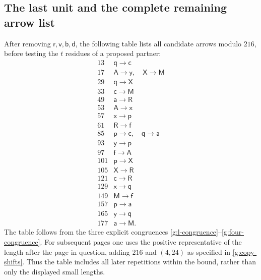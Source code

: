 \subsection{The last unit and the complete remaining arrow list}

After removing $\mathsf r,\mathsf v,\mathsf b,\mathsf d$,
the following table lists all candidate arrows modulo
$216$, before testing the $t$ residues of a proposed
partner:
\begin{equation}\label{g:remaining-mod216}
\begin{array}{c|l}
13&\mathsf q\longrightarrow\mathsf c\\
17&\mathsf A\longrightarrow\mathsf y,\quad
   \mathsf X\longrightarrow\mathsf M\\
29&\mathsf q\longrightarrow\mathsf X\\
33&\mathsf c\longrightarrow\mathsf M\\
49&\mathsf a\longrightarrow\mathsf R\\
53&\mathsf A\longrightarrow\mathsf x\\
57&\mathsf x\longrightarrow\mathsf p\\
61&\mathsf R\longrightarrow\mathsf f\\
85&\mathsf p\longrightarrow\mathsf c,\quad
   \mathsf q\longrightarrow\mathsf a\\
93&\mathsf y\longrightarrow\mathsf p\\
97&\mathsf f\longrightarrow\mathsf A\\
101&\mathsf p\longrightarrow\mathsf X\\
105&\mathsf X\longrightarrow\mathsf R\\
121&\mathsf c\longrightarrow\mathsf R\\
129&\mathsf x\longrightarrow\mathsf q\\
149&\mathsf M\longrightarrow\mathsf f\\
157&\mathsf p\longrightarrow\mathsf a\\
165&\mathsf y\longrightarrow\mathsf q\\
177&\mathsf a\longrightarrow\mathsf M.
\end{array}
\end{equation}
The table follows from the three explicit congruences
\eqref{g:l-congruence}--\eqref{g:four-congruence}.
For subsequent pages one uses the positive representative
of the length after the page in question, adding $216$
and $(4,24)$ as specified in
\eqref{g:copy-shifts}.  Thus the table includes all
later repetitions within the bound, rather than only
the displayed small lengths.

